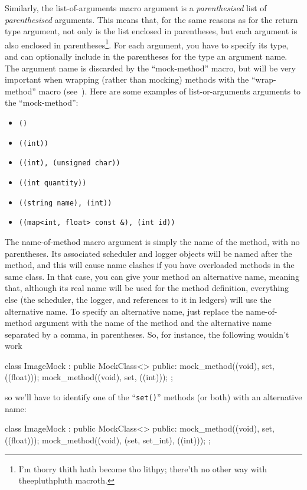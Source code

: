 \documentclass[twoside, a4paper, article]{memoir}
\begin{document}
Similarly, the list-of-arguments macro argument is a \emph{parenthesised} list
of \emph{parenthesised} arguments.  This means that, for the same reasons as
for the return type argument, not only is the list enclosed in parentheses, but
each argument is also enclosed in parentheses\footnote{I'm thorry thith hath
  become tho lithpy; there'th no other way with theepluthpluth macroth.}.  For
each argument, you have to specify its type, and can optionally include in the
parentheses for the type an argument name.  The argument name is discarded by
the ``mock-method'' macro, but will be very important when wrapping (rather
than mocking) methods with the ``wrap-method'' macro
(see~).  Here are some examples of list-or-arguments
arguments to the ``mock-method'':
\begin{itemize}
\item \texttt{()}
\item \texttt{((int))}
\item \texttt{((int), (unsigned char))}
\item \texttt{((int quantity))}
\item \texttt{((string name), (int))}
\item \texttt{((map<int, float> const \&), (int id))}
\end{itemize}

The name-of-method macro argument is simply the name of the method, with no
parentheses.  Its associated scheduler and logger objects will be named after
the method, and this will cause name clashes if you have overloaded methods in
the same class.  In that case, you can give your method an alternative name,
meaning that, although its real name will be used for the method definition,
everything else (the scheduler, the logger, and references to it in ledgers)
will use the alternative name.  To specify an alternative name, just replace
the name-of-method argument with the name of the method and the alternative
name separated by a comma, in parentheses.  So, for instance, the following
wouldn't work
\begin{cpplisting}
class ImageMock
  : public MockClass<> {
public:
  mock_method((void), set, ((float)));
  mock_method((void), set, ((int)));
};
\end{cpplisting}
so we'll have to identify one of the ``\texttt{set()}'' methods (or both) with
an alternative name:
\begin{cpplisting}
class ImageMock
  : public MockClass<> {
public:
  mock_method((void), set, ((float)));
  mock_method((void), (set, set_int), ((int)));
};
\end{cpplisting}
\end{document}
